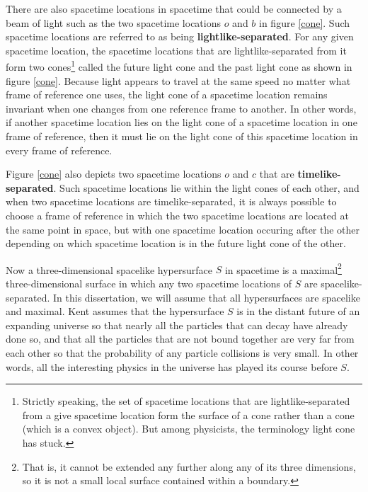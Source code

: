 There are also spacetime locations in spacetime that could be connected by a beam of light such as the two spacetime locations $o$ and $b$ in figure \ref{cone}. Such spacetime locations are referred to as being \textbf{lightlike-separated}. For any given spacetime location, the spacetime locations that are lightlike-separated from it form two cones\footnote{Strictly speaking, the set of spacetime locations that are lightlike-separated from a give spacetime location form the surface of a cone rather than a cone (which is a convex object). But among physicists, the terminology light cone has stuck.} called the future light cone and the past light cone as shown in figure \ref{cone}. Because light appears to travel at the same speed no matter what frame of reference one uses, the light cone of a spacetime location remains invariant when one changes from one reference frame to another. In other words, if another spacetime location lies on the light cone of a spacetime location in one frame of reference, then it must lie on the light cone of this spacetime location in every frame of reference. 

Figure \ref{cone} also depicts two spacetime locations $o$ and $c$ that are \textbf{timelike-separated}. Such spacetime locations lie within the light cones of each other, and when two spacetime locations are timelike-separated, it is always possible to choose a frame of reference in which the two spacetime locations are located at the same point in space, but with one spacetime location occuring after the other  depending on which spacetime location is in  the future light cone of the other. 

Now a three-dimensional spacelike hypersurface $S$ in spacetime is a maximal\footnote{That is, it cannot be extended any further along any of its three dimensions, so it is not a small local surface contained within a boundary.} three-dimensional surface in which any two spacetime locations of $S$ are spacelike-separated. In this dissertation, we will assume that all hypersurfaces are spacelike and maximal.
Kent assumes that the hypersurface $S$ is in the distant future of an expanding universe so that nearly all the particles that can decay have already done so, and that all the particles that are not bound together are very far from each other so that the probability of any particle collisions is very small. In other words, all the interesting physics in the universe has played its course before $S$.

